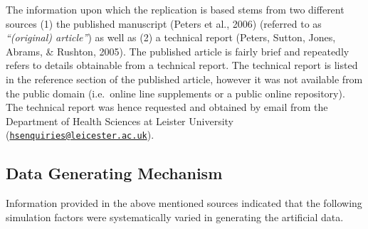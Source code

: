 \documentclass[
  english,
  doc,floatsintext,draftall]{apa6}
\begin{document}
The information upon which the replication is based stems from two different sources (1) the published manuscript (Peters et al., 2006) (referred to as \emph{\enquote{(original) article}}) as well as (2) a technical report (Peters, Sutton, Jones, Abrams, \& Rushton, 2005).
The published article is fairly brief and repeatedly refers to details obtainable from a technical report.
The technical report is listed in the reference section of the published article, however it was not available from the public domain (i.e.~online line supplements or a public online repository).
The technical report was hence requested and obtained by email from the Department of Health Sciences at Leister University (\href{mailto:hsenquiries@leicester.ac.uk}{\nolinkurl{hsenquiries@leicester.ac.uk}}).

\hypertarget{data-generating-mechanism}{%
\subsection{Data Generating Mechanism}\label{data-generating-mechanism}}

Information provided in the above mentioned sources indicated that the following simulation factors were systematically varied in generating the artificial data.
\end{document}
